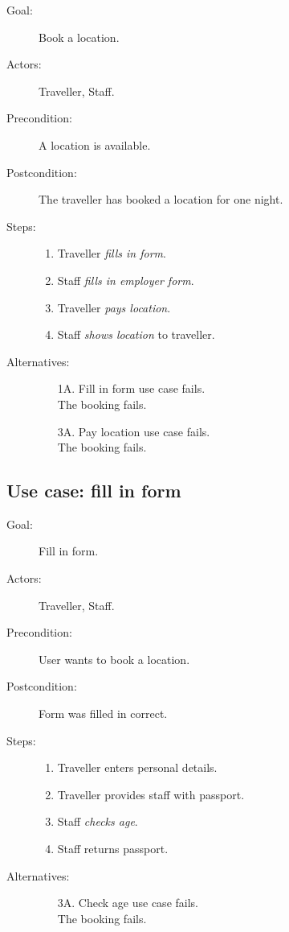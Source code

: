 \begin{description}
\item[Goal:] Book a location.
\item[Actors:] Traveller, Staff.
\item[Precondition:] A location is available.
\item[Postcondition:] The traveller has booked a location for one night.
\item[Steps:]
\begin{enumerate}
\item Traveller \textit{fills in form}.
\item Staff \textit{fills in employer form}.
\item Traveller \textit{pays location}.
\item Staff \textit{shows location} to traveller.
\end{enumerate}

\item[Alternatives:]
\begin{enumerate}
\item[1A.] Fill in form use case fails.\\
The booking fails.
\item[3A.] Pay location use case fails.\\
The booking fails.
\end{enumerate}
\end{description}

\subsection{Use case: fill in form}

\begin{description}
\item[Goal:] Fill in form.
\item[Actors:] Traveller, Staff.
\item[Precondition:] User wants to book a location.
\item[Postcondition:] Form was filled in correct.
\item[Steps:]
\begin{enumerate}
\item Traveller enters personal details.
\item Traveller provides staff with passport.
\item Staff \textit{checks age}.
\item Staff returns passport.
\end{enumerate}

\item[Alternatives:]
\begin{enumerate}
\item[3A.] Check age use case fails.\\
The booking fails.
\end{enumerate}
\end{description}

